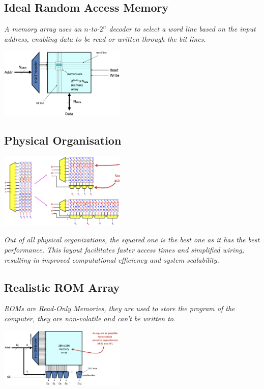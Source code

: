 \subsection{Ideal Random Access Memory}
\textit{A memory array uses an \(n\)-to-\(2^n\) decoder to select a word line based on the input address, enabling data to be read or written through the bit lines.}
\begin{center}
    \includegraphics[width=0.45\textwidth]{chapters/chapter1c/images/ideal_ram.png}
\end{center}
\subsection{Physical Organisation }
\begin{center}
    \includegraphics[width=0.45\textwidth]{chapters/chapter1c/images/organisation.png}
\end{center}
\textit{Out of all physical organizations, the squared one is the best one as it has the best performance. This layout facilitates faster access times and simplified wiring, resulting in improved computational efficiency and system scalability.}
\subsection{Realistic ROM Array}
\textit{ROMs are Read-Only Memories, they are used to store the program of the computer, they are non-volatile and can't be written to.} \\ \vspace*{5px}
\begin{center}
    \includegraphics[width=0.45\textwidth]{chapters/chapter1c/images/rom.png}
\end{center}
